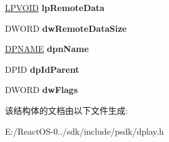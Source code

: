 \begin{DoxyCompactItemize}
\hyperlink{interfacevoid}{L\+P\+V\+O\+ID} {\bfseries lp\+Remote\+Data}
\item 
\mbox{\label{structtag_d_p_m_s_g___d_e_s_t_r_o_y_p_l_a_y_e_r_o_r_g_r_o_u_p_af7c6b6e428513f94322e791cea255628}} 
D\+W\+O\+RD {\bfseries dw\+Remote\+Data\+Size}
\item 
\mbox{\label{structtag_d_p_m_s_g___d_e_s_t_r_o_y_p_l_a_y_e_r_o_r_g_r_o_u_p_a25a98ef2cdbdd06305f06cadef531ccc}} 
\hyperlink{structtag_d_p_n_a_m_e}{D\+P\+N\+A\+ME} {\bfseries dpn\+Name}
\item 
\mbox{\label{structtag_d_p_m_s_g___d_e_s_t_r_o_y_p_l_a_y_e_r_o_r_g_r_o_u_p_add3460c7bcab68287c4228823317ba9e}} 
D\+P\+ID {\bfseries dp\+Id\+Parent}
\item 
\mbox{\label{structtag_d_p_m_s_g___d_e_s_t_r_o_y_p_l_a_y_e_r_o_r_g_r_o_u_p_a758420e37f227f9dfd5ef72ec867a380}} 
D\+W\+O\+RD {\bfseries dw\+Flags}
\end{DoxyCompactItemize}


该结构体的文档由以下文件生成\+:\begin{DoxyCompactItemize}
\item 
E\+:/\+React\+O\+S-\/0../sdk/include/psdk/dplay.\+h\end{DoxyCompactItemize}

